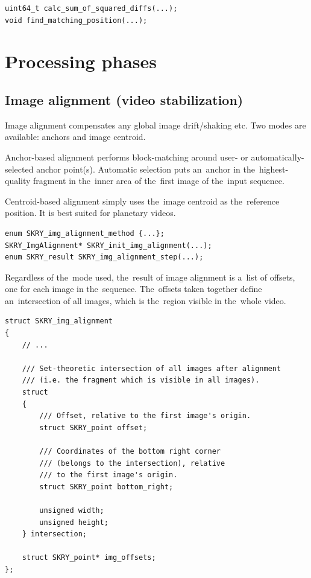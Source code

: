 \documentclass[12pt]{article}
\newcommand{\nbd}{\nobreakdash}
\begin{document}
\begin{lstlisting}[caption={Block matching ({\ttfamily{match.h/.c}})}]
uint64_t calc_sum_of_squared_diffs(...);
void find_matching_position(...);
\end{lstlisting}

\section{Processing phases}

\subsection{Image alignment (video stabilization)}\label{sec:imgalignment}

Image alignment compensates any global image drift/shaking etc. Two modes are available: anchors and image centroid.

Anchor-based alignment performs block\nbd-matching around user- or automatically\nbd-selec\-ted anchor point(s).
Automatic selection puts an~anchor in the~highest\nbd-quality fragment in the~inner area of the~first image of the~input
sequence.

Centroid\nbd-based alignment simply uses the~image centroid as the~reference position. It is best suited for planetary
videos.

\begin{lstlisting}[caption={Image alignment ({\ttfamily{img\_align.h/.c}})}]
enum SKRY_img_alignment_method {...};
SKRY_ImgAlignment* SKRY_init_img_alignment(...);
enum SKRY_result SKRY_img_alignment_step(...);
\end{lstlisting}

Regardless of the~mode used, the~result of image alignment is a~list of offsets, one for each image in the~sequence.
The~offsets taken together define an~intersection of all images, which is the~region visible in the~whole video.

\begin{lstlisting}
struct SKRY_img_alignment
{
    // ...

    /// Set-theoretic intersection of all images after alignment
    /// (i.e. the fragment which is visible in all images).
    struct
    {
        /// Offset, relative to the first image's origin.
        struct SKRY_point offset;

        /// Coordinates of the bottom right corner
        /// (belongs to the intersection), relative
        /// to the first image's origin.
        struct SKRY_point bottom_right;

        unsigned width;
        unsigned height;
    } intersection;

    struct SKRY_point* img_offsets;
};
\end{lstlisting}
\end{document}
